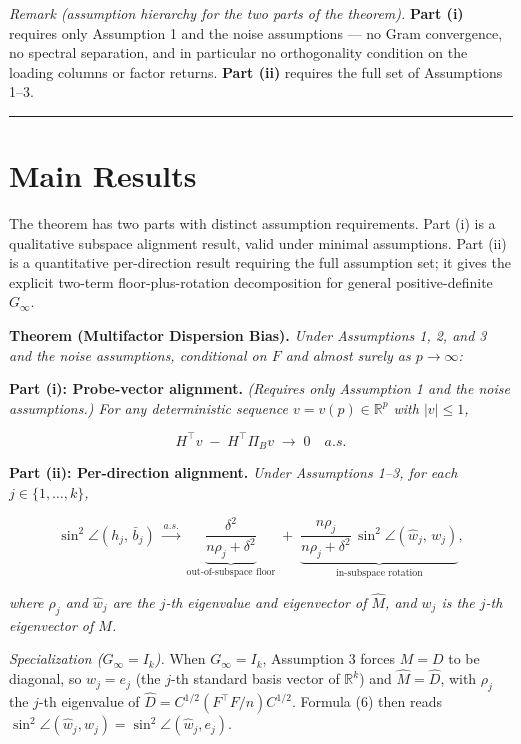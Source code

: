 \documentclass{article}
\theoremstyle{remark}
\begin{document}
\textit{Remark (assumption hierarchy for the two parts of the theorem).} \textbf{Part (i)} requires only Assumption 1 and the noise assumptions — no Gram convergence, no spectral separation, and in particular no orthogonality condition on the loading columns or factor returns. \textbf{Part (ii)} requires the full set of Assumptions 1–3.

\medskip\noindent\rule{\linewidth}{0.4pt}\medskip

\section{Main Results}

The theorem has two parts with distinct assumption requirements. Part (i) is a qualitative subspace alignment result, valid under minimal assumptions. Part (ii) is a quantitative per-direction result requiring the full assumption set; it gives the explicit two-term floor-plus-rotation decomposition for general positive-definite $G_\infty$.

\textbf{Theorem (Multifactor Dispersion Bias).} \textit{Under Assumptions 1, 2, and 3 and the noise assumptions, conditional on $F$ and almost surely as $p\to\infty$:}

\textbf{Part (i): Probe-vector alignment.} \textit{(Requires only Assumption 1 and the noise assumptions.) For any deterministic sequence $v = v(p)\in\mathbb{R}^p$ with $|v|\le 1$,}

\[
H^\top v \;-\; H^\top\Pi_B v \;\longrightarrow\; 0 \quad a.s. \tag{5}
\]

\textbf{Part (ii): Per-direction alignment.} \textit{Under Assumptions 1–3, for each $j\in\{1,\ldots,k\}$,}

\[
\sin^2\angle(h_j,\,\bar{b}_j) \;\xrightarrow{a.s.}\;
\underbrace{\frac{\delta^2}{n\rho_j + \delta^2}}_{\text{out-of-subspace floor}}
\;+\;
\underbrace{\frac{n\rho_j}{n\rho_j + \delta^2}\,\sin^2\angle(\hat{w}_j,\,w_j)}_{\text{in-subspace rotation}},
\tag{6}
\]

\textit{where $\rho_j$ and $\hat{w}_j$ are the $j$-th eigenvalue and eigenvector of $\hat{M}$, and $w_j$ is the $j$-th eigenvector of $M$.}

\textit{Specialization ($G_\infty = I_k$).} When $G_\infty = I_k$, Assumption 3 forces $M = D$ to be diagonal, so $w_j = e_j$ (the $j$-th standard basis vector of $\mathbb{R}^k$) and $\hat{M} = \hat{D}$, with $\rho_j$ the $j$-th eigenvalue of $\hat{D} = C^{1/2}(F^\top F/n)C^{1/2}$. Formula (6) then reads $\sin^2\angle(\hat{w}_j, w_j) = \sin^2\angle(\hat{w}_j, e_j)$.
\end{document}
